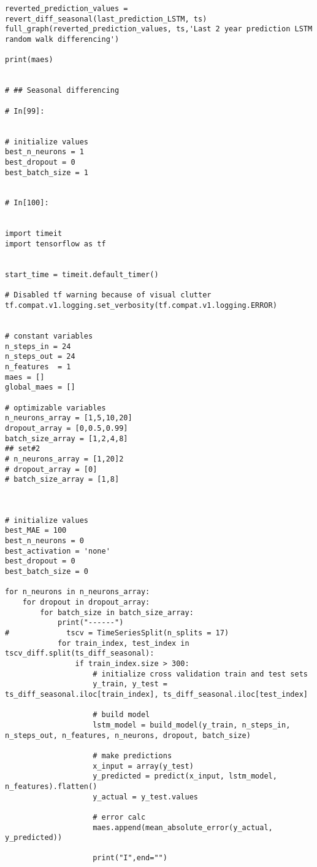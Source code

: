 \begin{verbatim}
reverted_prediction_values = revert_diff_seasonal(last_prediction_LSTM, ts)
full_graph(reverted_prediction_values, ts,'Last 2 year prediction LSTM random walk differencing')

print(maes)


# ## Seasonal differencing

# In[99]:


# initialize values
best_n_neurons = 1
best_dropout = 0
best_batch_size = 1


# In[100]:


import timeit
import tensorflow as tf


start_time = timeit.default_timer()

# Disabled tf warning because of visual clutter
tf.compat.v1.logging.set_verbosity(tf.compat.v1.logging.ERROR)


# constant variables
n_steps_in = 24
n_steps_out = 24
n_features  = 1
maes = []
global_maes = []

# optimizable variables
n_neurons_array = [1,5,10,20]
dropout_array = [0,0.5,0.99]
batch_size_array = [1,2,4,8]
## set#2
# n_neurons_array = [1,20]2
# dropout_array = [0]
# batch_size_array = [1,8]



# initialize values
best_MAE = 100
best_n_neurons = 0
best_activation = 'none'
best_dropout = 0
best_batch_size = 0

for n_neurons in n_neurons_array:
    for dropout in dropout_array:
        for batch_size in batch_size_array:
            print("------")
#             tscv = TimeSeriesSplit(n_splits = 17)
            for train_index, test_index in tscv_diff.split(ts_diff_seasonal): 
                if train_index.size > 300:  
                    # initialize cross validation train and test sets
                    y_train, y_test = ts_diff_seasonal.iloc[train_index], ts_diff_seasonal.iloc[test_index]

                    # build model
                    lstm_model = build_model(y_train, n_steps_in, n_steps_out, n_features, n_neurons, dropout, batch_size)

                    # make predictions
                    x_input = array(y_test)
                    y_predicted = predict(x_input, lstm_model, n_features).flatten()
                    y_actual = y_test.values

                    # error calc
                    maes.append(mean_absolute_error(y_actual, y_predicted))

                    print("I",end="")


\end{verbatim}
